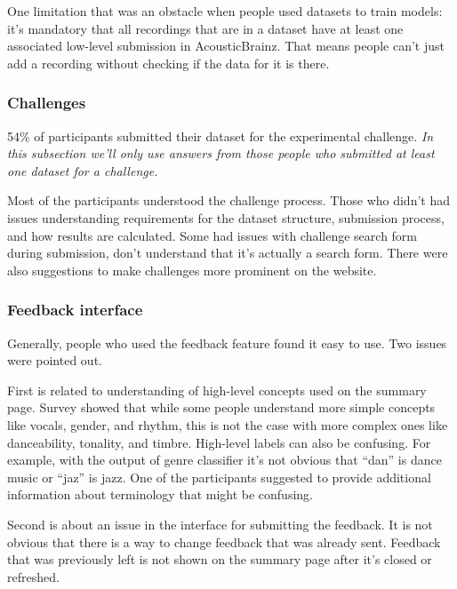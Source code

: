 One limitation that was an obstacle when people used datasets to train models: it's mandatory that all recordings that are in a dataset have at least one associated low-level submission in AcousticBrainz. That means people can't just add a recording without checking if the data for it is there.

\subsubsection{Challenges}

54\% of participants submitted their dataset for the experimental challenge. \textit{In this subsection we'll only use answers from those people who submitted at least one dataset for a challenge.}

Most of the participants understood the challenge process. Those who didn't had issues understanding requirements for the dataset structure, submission process, and how results are calculated. Some had issues with challenge search form during submission, don't understand that it's actually a search form. There were also suggestions to make challenges more prominent on the website.

\subsubsection{Feedback interface}

Generally, people who used the feedback feature found it easy to use. Two issues were pointed out.

First is related to understanding of high-level concepts used on the summary page. Survey showed that while some people understand more simple concepts like vocals, gender, and rhythm, this is not the case with more complex ones like danceability, tonality, and timbre. High-level labels can also be confusing. For example, with the output of genre classifier it's not obvious that ``dan'' is dance music or ``jaz'' is jazz. One of the participants suggested to provide additional information about terminology that might be confusing.

Second is about an issue in the interface for submitting the feedback. It is not obvious that there is a way to change feedback that was already sent. Feedback that was previously left is not shown on the summary page after it's closed or refreshed.
